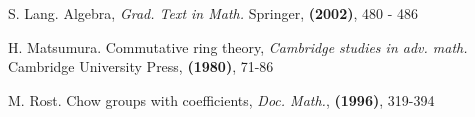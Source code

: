 
\begin{thebibliography}{10}

S. Lang.
Algebra, {\em Grad. Text in Math.}
Springer, \textbf{(2002)}, 480 - 486

H. Matsumura.
Commutative ring theory, {\em Cambridge studies in adv. math.}
Cambridge University Press, \textbf{(1980)}, 71-86

M. Rost.
Chow groups with coefficients,
{\em Doc. Math.}, \textbf{(1996)}, 319-394

\end{thebibliography}
